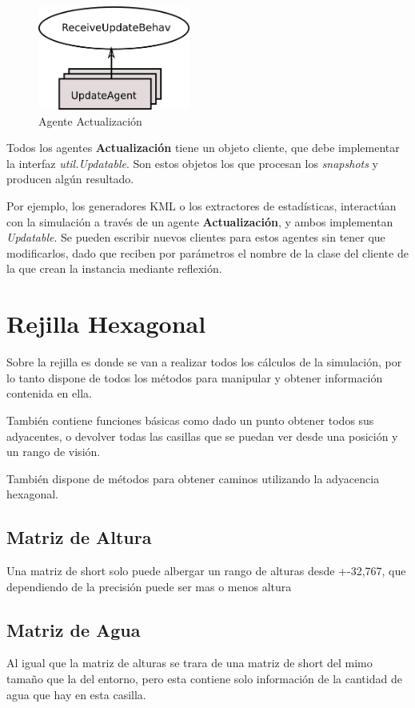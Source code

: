 \begin{figure}[H]
 \centering
 \includegraphics[width=50mm]{figuras/cap5/ag_update.png}
 \caption{Agente Actualización}
\end{figure}

Todos los agentes {\bf Actualización} tiene un objeto cliente, que debe
implementar la interfaz {\em util.Updatable}. Son estos objetos los que
procesan los {\em snapshots} y producen algún resultado.

Por ejemplo, los generadores KML o los extractores de estadísticas, interactúan
con la simulación a través de un agente {\bf Actualización}, y ambos
implementan {\em Updatable}. Se pueden escribir nuevos clientes para estos
agentes sin tener que modificarlos, dado que reciben por parámetros el nombre
de la clase del cliente de la que crean la instancia mediante reflexión.

\section*{Rejilla Hexagonal}
Sobre la rejilla es donde se van a realizar todos los cálculos de la
simulación, por lo tanto dispone de todos los métodos para manipular
y obtener información contenida en ella.

También contiene funciones básicas como dado un punto obtener todos sus
adyacentes, o devolver todas las casillas que se puedan ver desde una posición
y un rango de visión.

También dispone de métodos para obtener caminos utilizando la adyacencia
hexagonal.
\subsection*{Matriz de Altura}
Una matriz de short solo puede albergar un rango de alturas desde +-32,767, que
dependiendo de la precisión puede ser mas o menos altura
\subsection*{Matriz de Agua}
Al igual que la matriz de alturas se trara de una matriz de short del mimo
tamaño que la del entorno, pero esta contiene solo información de la cantidad
de agua que hay en esta casilla.

